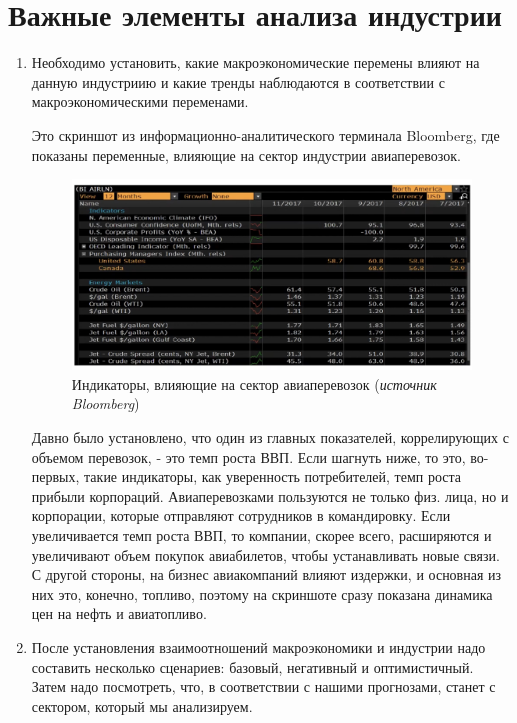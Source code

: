 \documentclass{article}
\begin{document}
	
	\section {Важные элементы анализа индустрии}
	\begin{enumerate}
	\item Необходимо установить, какие макроэкономические перемены влияют на данную индустриию и какие тренды наблюдаются в соответствии с макроэкономическими переменами. 
	
	Это скриншот из информационно-аналитического терминала Bloomberg, где показаны переменные, влияющие на сектор индустрии авиаперевозок. 
	\begin{figure}[h]
		\centering
		\includegraphics[scale = 0.25]{avia.jpg}
		\caption{Индикаторы, влияющие на сектор авиаперевозок (\textit{источник Bloomberg})}
		\label{model}
	\end{figure}
	
	Давно было установлено, что один из главных показателей, коррелирующих с объемом перевозок, - это темп роста ВВП. Если шагнуть ниже, то это, во-первых, такие индикаторы, как уверенность потребителей, темп роста прибыли корпораций. Авиаперевозками пользуются не только физ. лица, но и корпорации, которые отправляют сотрудников в командировку. Если увеличивается темп роста ВВП, то компании, скорее всего, расширяются и увеличивают объем покупок авиабилетов, чтобы устанавливать новые связи. С другой стороны, на бизнес авиакомпаний влияют издержки, и основная из них это, конечно, топливо, поэтому на скриншоте сразу показана динамика цен на нефть и авиатопливо.
	
	\item После установления взаимоотношений макроэкономики и индустрии надо составить несколько сценариев: базовый, негативный и оптимистичный. Затем надо посмотреть, что, в соответствии с нашими прогнозами, станет с сектором, который мы анализируем.
	

\end{enumerate}
\end{document}
